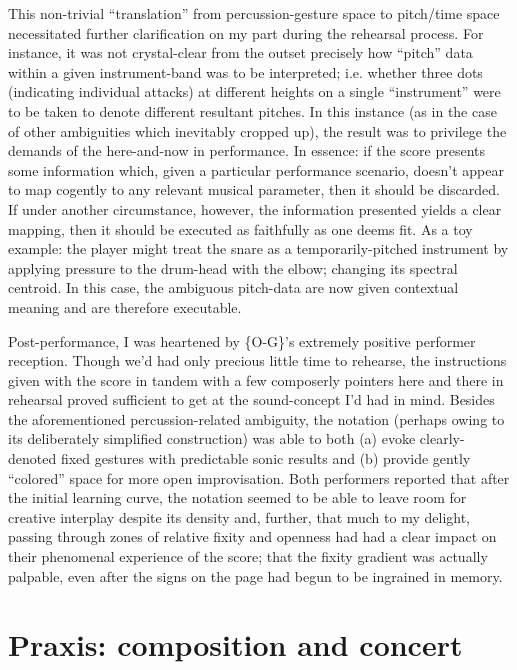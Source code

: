     This non-trivial ``translation'' from percussion-gesture space to pitch/time space necessitated further clarification on my part during the rehearsal process. For instance, it was not crystal-clear from the outset precisely how ``pitch'' data within a given instrument-band was to be interpreted; i.e. whether three dots (indicating individual attacks) at different heights on a single ``instrument'' were to be taken to denote different resultant pitches. In this instance (as in the case of other ambiguities which inevitably cropped up), the result was to privilege the demands of the here-and-now in performance. In essence: if the score presents some information which, given a particular performance scenario, doesn't appear to map cogently to any relevant musical parameter, then it should be discarded. If under another circumstance, however, the information presented yields a clear mapping, then it should be executed as faithfully as one deems fit. As a toy example: the player might treat the snare as a temporarily-pitched instrument by applying pressure to the drum-head with the elbow; changing its spectral centroid. In this case, the ambiguous pitch-data are now given contextual meaning and are therefore executable.

    Post-performance, I was heartened by \{O-G\}'s extremely positive performer reception. Though we'd had only precious little time to rehearse, the instructions given with the score in tandem with a few composerly pointers here and there in rehearsal proved sufficient to get at the sound-concept I'd had in mind. Besides the aforementioned percussion-related ambiguity, the notation (perhaps owing to its deliberately simplified construction) was able to both (a) evoke clearly-denoted fixed gestures with predictable sonic results and (b) provide gently ``colored'' space for more open improvisation. Both performers reported that after the initial learning curve, the notation seemed to be able to leave room for creative interplay despite its density and, further, that much to my delight, passing through zones of relative fixity and openness had had a clear impact on their phenomenal experience of the score; that the fixity gradient was actually palpable, even after the signs on the page had begun to be ingrained in memory.

\section{Praxis: composition and concert}

